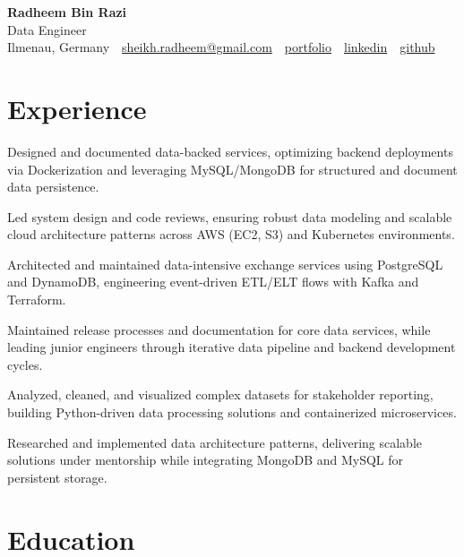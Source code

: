 \documentclass[11pt,a4paper]{resume}
\makeatletter
\newcommand{\Portfolio}{https://radheem.github.io/my-cv}
\newcommand{\PortfolioText}{portfolio}
\newcommand{\GitHub}{https://github.com/radheem}
\newcommand{\LinkedIn}{https://www.linkedin.com/in/radheem-razi}
\newcommand{\Email}{sheikh.radheem@gmail.com}
\makeatother
\begin{document}
\begin{center}
  {\huge\bfseries Radheem Bin Razi}\\[3pt]
  {\large Data Engineer}\\[6pt]
  \small
  Ilmenau, Germany \,\textbar\,
  \href{mailto:\Email}{\Email} \,\textbar\,
  \href{\Portfolio}{\PortfolioText} \,\textbar\,
  \href{\LinkedIn}{linkedin} \,\textbar\,
  \href{\GitHub}{github}
\end{center}
\vspace{2pt}

\section{Experience}

\bullets
  \item Designed and documented data-backed services, optimizing backend deployments via Dockerization and leveraging MySQL/MongoDB for structured and document data persistence.
  \item Led system design and code reviews, ensuring robust data modeling and scalable cloud architecture patterns across AWS (EC2, S3) and Kubernetes environments.
\bulletsend
\vspace{3pt}
\bullets
  \item Architected and maintained data-intensive exchange services using PostgreSQL and DynamoDB, engineering event-driven ETL/ELT flows with Kafka and Terraform.
  \item Maintained release processes and documentation for core data services, while leading junior engineers through iterative data pipeline and backend development cycles.
\bulletsend
\vspace{3pt}
\bullets
  \item Analyzed, cleaned, and visualized complex datasets for stakeholder reporting, building Python-driven data processing solutions and containerized microservices.
  \item Researched and implemented data architecture patterns, delivering scalable solutions under mentorship while integrating MongoDB and MySQL for persistent storage.
\bulletsend
\vspace{3pt}

\section{Education}
\end{document}
